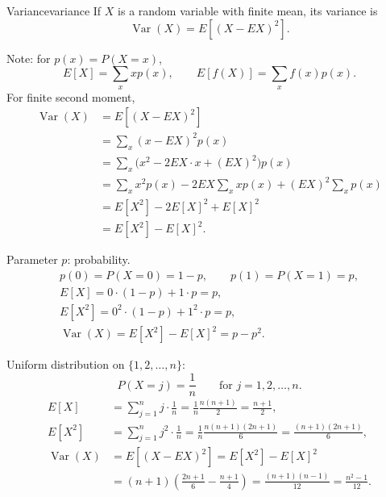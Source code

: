 \begin{definition}{Variance}{variance}
  If $X$ is a random variable with finite mean, its variance is
  \[
    \operatorname{Var}(X)=E[(X-EX)^2].
  \]
\end{definition}

Note: for $p(x)=P(X=x)$,
\[
  E[X]=\sum_x xp(x),\qquad E[f(X)]=\sum_x f(x)p(x).
\]
For finite second moment,
\begin{align*}
  \operatorname{Var}(X) & =E[(X-EX)^2]                                      \\
                        & =\sum_x(x-EX)^2p(x)                               \\
                        & =\sum_x\bigl(x^2-2EX\cdot x+(EX)^2\bigr)p(x)      \\
                        & =\sum_x x^2p(x)-2EX\sum_x xp(x)+(EX)^2\sum_x p(x) \\
                        & =E[X^2]-2E[X]^2+E[X]^2                            \\
                        & =E[X^2]-E[X]^2.
\end{align*}

\begin{example}
  Parameter $p$: probability.
  \begin{gather*}
    p(0)=P(X=0)=1-p,\qquad p(1)=P(X=1)=p,\\
    E[X]=0\cdot(1-p)+1\cdot p=p,\\
    E[X^2]=0^2\cdot(1-p)+1^2\cdot p=p,\\
    \operatorname{Var}(X)=E[X^2]-E[X]^2=p-p^2.
  \end{gather*}
  \begin{center}
  \end{center}
\end{example}

\begin{example}
  Uniform distribution on $\{1,2,\ldots,n\}$:
  \[
    P(X=j)=\frac1n\qquad\text{for }j=1,2,\ldots,n.
  \]
  \begin{align*}
    E[X]                  & =\sum_{j=1}^n j\cdot\frac1n
    =\frac1n\frac{n(n+1)}2=\frac{n+1}2,                                 \\
    E[X^2]                & =\sum_{j=1}^n j^2\cdot\frac1n
    =\frac1n\frac{n(n+1)(2n+1)}6=\frac{(n+1)(2n+1)}6,                   \\
    \operatorname{Var}(X) & =E[(X-EX)^2]=E[X^2]-E[X]^2                  \\
                          & =(n+1)\left(\frac{2n+1}6-\frac{n+1}4\right)
    =\frac{(n+1)(n-1)}{12}=\frac{n^2-1}{12}.
  \end{align*}
\end{example}

